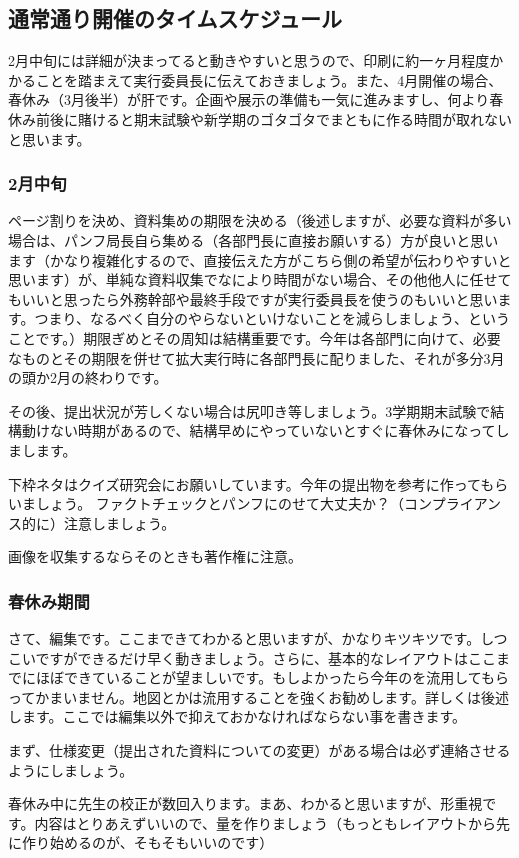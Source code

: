 \documentclass[dvipdfmx,jb5]{jarticle}
\begin{document}
\subsection{通常通り開催のタイムスケジュール}
2月中旬には詳細が決まってると動きやすいと思うので、印刷に約一ヶ月程度かかることを踏まえて実行委員長に伝えておきましょう。また、4月開催の場合、春休み（3月後半）が肝です。企画や展示の準備も一気に進みますし、何より春休み前後に賭けると期末試験や新学期のゴタゴタでまともに作る時間が取れないと思います。

\subsubsection{2月中旬}
ページ割りを決め、資料集めの期限を決める（後述しますが、必要な資料が多い場合は、パンフ局長自ら集める（各部門長に直接お願いする）方が良いと思います（かなり複雑化するので、直接伝えた方がこちら側の希望が伝わりやすいと思います）が、単純な資料収集でなにより時間がない場合、その他他人に任せてもいいと思ったら外務幹部や最終手段ですが実行委員長を使うのもいいと思います。つまり、なるべく自分のやらないといけないことを減らしましょう、ということです。）期限ぎめとその周知は結構重要です。今年は各部門に向けて、必要なものとその期限を併せて拡大実行時に各部門長に配りました、それが多分3月の頭か2月の終わりです。

その後、提出状況が芳しくない場合は尻叩き等しましょう。3学期期末試験で結構動けない時期があるので、結構早めにやっていないとすぐに春休みになってしまします。

下枠ネタはクイズ研究会にお願いしています。今年の提出物を参考に作ってもらいましょう。
ファクトチェックとパンフにのせて大丈夫か？（コンプライアンス的に）注意しましょう。

画像を収集するならそのときも著作権に注意。

\subsubsection{春休み期間}
さて、編集です。ここまできてわかると思いますが、かなりキツキツです。しつこいですができるだけ早く動きましょう。さらに、基本的なレイアウトはここまでにほぼできていることが望ましいです。もしよかったら今年のを流用してもらってかまいません。地図とかは流用することを強くお勧めします。詳しくは後述します。ここでは編集以外で抑えておかなければならない事を書きます。

まず、仕様変更（提出された資料についての変更）がある場合は必ず連絡させるようにしましょう。

春休み中に先生の校正が数回入ります。まあ、わかると思いますが、形重視です。内容はとりあえずいいので、量を作りましょう（もっともレイアウトから先に作り始めるのが、そもそもいいのです）
\end{document}

